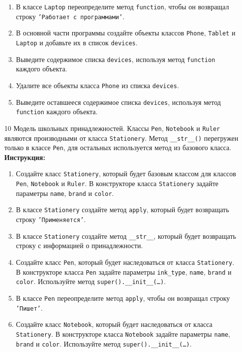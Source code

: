 \begin{enumerate}
\begin{enumerate}
    \item В классе \texttt{Laptop} переопределите метод \texttt{function}, чтобы он возвращал строку \texttt{'Работает с программами'}.
    \item В основной части программы создайте объекты классов \texttt{Phone}, \texttt{Tablet} и \texttt{Laptop} и добавьте их в список \texttt{devices}.
    \item Выведите содержимое списка \texttt{devices}, используя метод \texttt{function} каждого объекта.
    \item Удалите все объекты класса \texttt{Phone} из списка \texttt{devices}.
    \item Выведите оставшееся содержимое списка \texttt{devices}, используя метод \texttt{function} каждого объекта.
\end{enumerate}
\item[10]
Модель школьных принадлежностей. Классы \texttt{Pen}, \texttt{Notebook} и \texttt{Ruler} являются производными от класса \texttt{Stationery}. Метод \texttt{\_\_str\_\_()} перегружен только в классе \texttt{Pen}, для остальных используется метод из базового класса.
\textbf{Инструкция:}
\begin{enumerate}
    \item Создайте класс \texttt{Stationery}, который будет базовым классом для классов \texttt{Pen}, \texttt{Notebook} и \texttt{Ruler}. В конструкторе класса \texttt{Stationery} задайте параметры \texttt{name}, \texttt{brand} и \texttt{color}.
    \item В классе \texttt{Stationery} создайте метод \texttt{apply}, который будет возвращать строку \texttt{'Применяется'}.
    \item В классе \texttt{Stationery} создайте метод \texttt{\_\_str\_\_}, который будет возвращать строку с информацией о принадлежности.
    \item Создайте класс \texttt{Pen}, который будет наследоваться от класса \texttt{Stationery}. В конструкторе класса \texttt{Pen} задайте параметры \texttt{ink\_type}, \texttt{name}, \texttt{brand} и \texttt{color}. Используйте метод \texttt{super().\_\_init\_\_(\ldots)}.
    \item В классе \texttt{Pen} переопределите метод \texttt{apply}, чтобы он возвращал строку \texttt{'Пишет'}.
    \item Создайте класс \texttt{Notebook}, который будет наследоваться от класса \texttt{Stationery}. В конструкторе класса \texttt{Notebook} задайте параметры \texttt{name}, \texttt{brand} и \texttt{color}. Используйте метод \texttt{super().\_\_init\_\_(\ldots)}.

\end{enumerate}
\end{enumerate}
